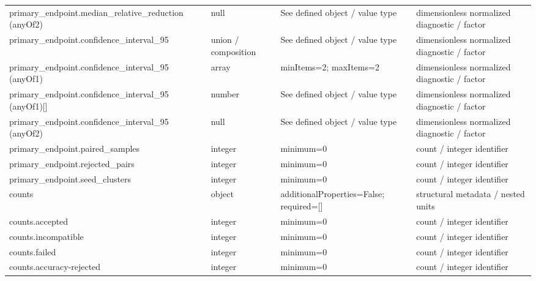 \begin{longtable}{@{}>{\raggedright\arraybackslash}p{}>{\raggedright\arraybackslash}p{}>{\raggedright\arraybackslash}p{}>{\raggedright\arraybackslash}p{}@{}}
primary\_\allowbreak{}endpoint.\allowbreak{}median\_\allowbreak{}relative\_\allowbreak{}reduction (anyOf2) & null & See defined object /\allowbreak{} value type & dimensionless normalized diagnostic /\allowbreak{} factor\\
primary\_\allowbreak{}endpoint.\allowbreak{}confidence\_\allowbreak{}interval\_\allowbreak{}95 & union /\allowbreak{} composition & See defined object /\allowbreak{} value type & dimensionless normalized diagnostic /\allowbreak{} factor\\
primary\_\allowbreak{}endpoint.\allowbreak{}confidence\_\allowbreak{}interval\_\allowbreak{}95 (anyOf1) & array & minItems=\allowbreak{}2; maxItems=\allowbreak{}2 & dimensionless normalized diagnostic /\allowbreak{} factor\\
primary\_\allowbreak{}endpoint.\allowbreak{}confidence\_\allowbreak{}interval\_\allowbreak{}95 (anyOf1)[] & number & See defined object /\allowbreak{} value type & dimensionless normalized diagnostic /\allowbreak{} factor\\
primary\_\allowbreak{}endpoint.\allowbreak{}confidence\_\allowbreak{}interval\_\allowbreak{}95 (anyOf2) & null & See defined object /\allowbreak{} value type & dimensionless normalized diagnostic /\allowbreak{} factor\\
primary\_\allowbreak{}endpoint.\allowbreak{}paired\_\allowbreak{}samples & integer & minimum=\allowbreak{}0 & count /\allowbreak{} integer identifier\\
primary\_\allowbreak{}endpoint.\allowbreak{}rejected\_\allowbreak{}pairs & integer & minimum=\allowbreak{}0 & count /\allowbreak{} integer identifier\\
primary\_\allowbreak{}endpoint.\allowbreak{}seed\_\allowbreak{}clusters & integer & minimum=\allowbreak{}0 & count /\allowbreak{} integer identifier\\
counts & object & additionalProperties=\allowbreak{}False; required=\allowbreak{}[] & structural metadata /\allowbreak{} nested units\\
counts.\allowbreak{}accepted & integer & minimum=\allowbreak{}0 & count /\allowbreak{} integer identifier\\
counts.\allowbreak{}incompatible & integer & minimum=\allowbreak{}0 & count /\allowbreak{} integer identifier\\
counts.\allowbreak{}failed & integer & minimum=\allowbreak{}0 & count /\allowbreak{} integer identifier\\
counts.\allowbreak{}accuracy-\allowbreak{}rejected & integer & minimum=\allowbreak{}0 & count /\allowbreak{} integer identifier\\

\end{longtable}
